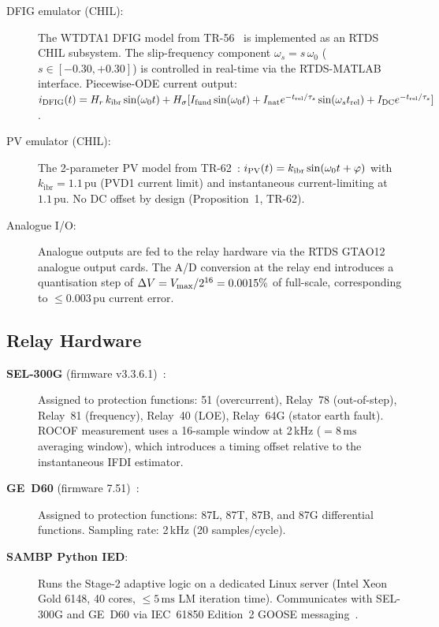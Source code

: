 \documentclass[11pt, a4paper]{article}
\newcommand{\pu}{\,\text{pu}}
\newcommand{\kibr}{k_{\mathrm{ibr}}}
\begin{document}
\begin{description}
  \item[DFIG emulator (CHIL):]
    The WTDTA1 DFIG model from TR-56~\cite{SAMBP_TR56} is implemented as an
    RTDS CHIL subsystem.  The slip-frequency component $\omega_s = s\,\omega_0$
    ($s \in [-0.30, +0.30]$) is controlled in real-time via the RTDS-MATLAB
    interface.
    Piecewise-ODE current output:
    $i_{\rm DFIG}(t) = H_r\,k_{\rm ibr}\sin(\omega_0 t) +
    H_\sigma[I_{\rm fund}\sin(\omega_0 t) + I_{\rm nat}e^{-t_{\rm rel}/\tau_s}
    \sin(\omega_s t_{\rm rel}) + I_{\rm DC}e^{-t_{\rm rel}/\tau_s}]$.

  \item[PV emulator (CHIL):]
    The 2-parameter PV model from TR-62~\cite{SAMBP_TR62}:
    $i_{\rm PV}(t) = \kibr\sin(\omega_0 t + \varphi)$
    with $\kibr = 1.1\pu$ (PVD1 current limit) and instantaneous
    current-limiting at $1.1\pu$.  No DC offset by
    design (Proposition~1, TR-62).

  \item[Analogue I/O:]
    Analogue outputs are fed to the relay hardware via the RTDS GTAO12
    analogue output cards.  The A/D conversion at the relay end introduces
    a quantisation step of $\Delta V = V_{\rm max}/2^{16} = 0.0015\%$ of
    full-scale, corresponding to $\leq 0.003\pu$ current error.
\end{description}

\subsection{Relay Hardware}

\begin{description}
  \item[\textbf{SEL-300G} (firmware v3.3.6.1)~\cite{SEL300G}:]
    Assigned to protection functions:
    51 (overcurrent), Relay~78 (out-of-step), Relay~81 (frequency),
    Relay~40 (LOE), Relay~64G (stator earth fault).
    ROCOF measurement uses a 16-sample window at 2\,kHz ($= 8\,\text{ms}$
    averaging window), which introduces a timing offset relative to the
    instantaneous IFDI estimator.

  \item[\textbf{GE~D60} (firmware 7.51)~\cite{GED60}:]
    Assigned to protection functions:
    87L, 87T, 87B, and 87G differential functions.
    Sampling rate: 2\,kHz (20 samples/cycle).

  \item[\textbf{SAMBP Python IED}:]
    Runs the Stage-2 adaptive logic on a dedicated Linux server
    (Intel Xeon Gold 6148, 40 cores, $\leq 5\,\text{ms}$ LM iteration time).
    Communicates with SEL-300G and GE~D60 via IEC~61850 Edition~2 GOOSE
    messaging~\cite{IEC61850Ed2}.
\end{description}
\end{document}
